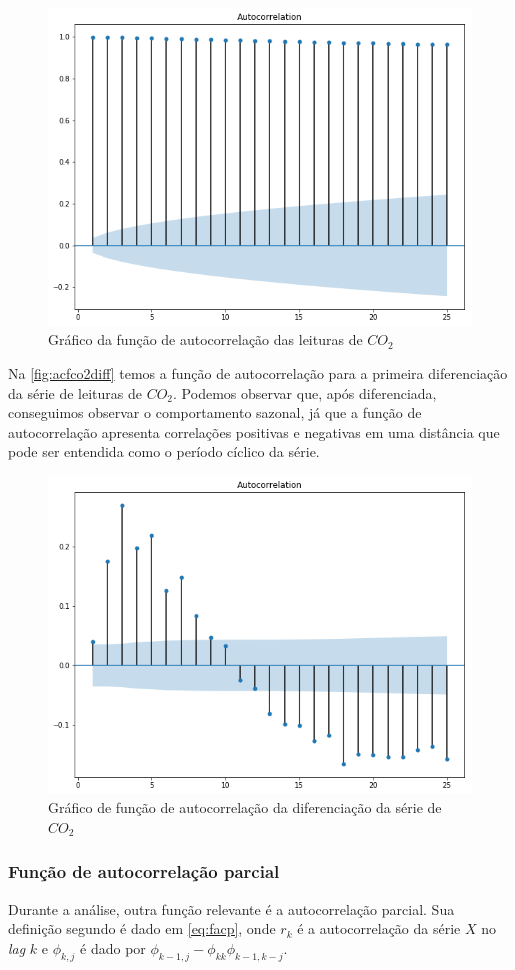 \documentclass[
    12pt,
    oneside,
    a4paper,
    english,
    brazil
]{abntex2}
\begin{document}
\begin{figure}[ht]
    \centering
    \caption{Gráfico da função de autocorrelação das leituras de
        $CO_2$}\label{fig:correlogramaCo2}
    \includegraphics[width=.5\linewidth]{images/acf_co2.png}
\end{figure}

Na \autoref{fig:acfco2diff}  temos a função  de autocorrelação para  a primeira
diferenciação  da  série de  leituras  de  $CO_2$.  Podemos observar  que, após
diferenciada, conseguimos observar o comportamento sazonal, já que  a função de
autocorrelação apresenta correlações positivas e negativas em uma distância que
pode ser entendida como o período cíclico da série.

\begin{figure}[ht]
    \centering
    \caption{Gráfico de função de autocorrelação da diferenciação da série de
        $CO_2$}\label{fig:acfco2diff}
    \includegraphics[width=.5\linewidth]{images/acf_co2_diff.png}
\end{figure}

\subsubsection{Função de autocorrelação parcial}

Durante a análise, outra função relevante é a autocorrelação parcial.
Sua definição segundo  é dado em \autoref{eq:facp}, onde
$r_k$ é a autocorrelação da série $X$ no \textit{lag} $k$ e $\phi_{k,j}$ é dado
por $\phi_{k-1, j}-\phi_{kk}\phi_{k-1,k-j}$.
\end{document}
